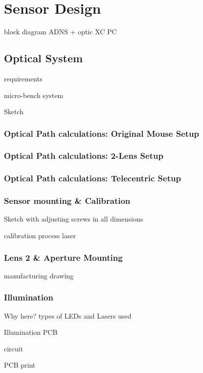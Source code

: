 \documentclass[12pt,a4paper]{article}
\begin{document}
\section{Sensor Design}

block diagram
  ADNS + optic
  XC
  PC

\subsection{Optical System}
  requirements

micro-bench system

Sketch

\subsubsection{Optical Path calculations: Original Mouse Setup}

\subsubsection{Optical Path calculations: 2-Lens Setup}

\subsubsection{Optical Path calculations: Telecentric Setup}


\subsubsection{Sensor mounting \& Calibration}

Sketch with adjusting screws in all dimensions

calibration process
  laser

\subsubsection{Lens 2 \& Aperture Mounting}

manufacturing drawing

\subsubsection{Illumination}

  Why here?
  types of LEDs and Lasers used
 
  Illumination PCB

  circuit

  PCB print
\end{document}
